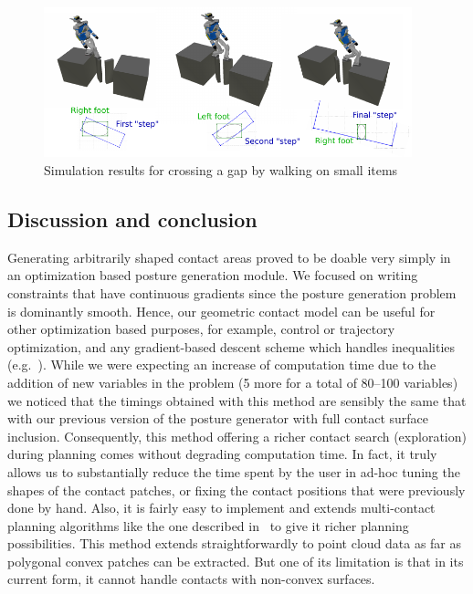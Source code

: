 \begin{figure}[!htb]
  \centering
  \includegraphics[width=0.95\textwidth]{riviere3steps.pdf}
  \caption{Simulation results for crossing a gap by walking on small items}
\label{fig:riviere}
\end{figure}



\subsection{Discussion and conclusion}


Generating arbitrarily shaped contact areas proved to be doable very simply in an optimization based posture generation module.
We focused on writing constraints that have continuous gradients since the posture generation problem is dominantly smooth.
Hence, our geometric contact model can be useful for other optimization based purposes, for example, control or trajectory optimization, and any gradient-based descent scheme which handles inequalities (e.g.~\cite{escande:icra:2010}).
While we were expecting an increase of computation time due to the addition of new variables in the problem (5 more for a total of 80--100 variables)
we noticed that the timings obtained with this method are sensibly the same that with our previous version of the posture generator with full contact surface inclusion.
Consequently, this method offering a richer contact search (exploration) during planning comes without degrading computation time.
In fact, it truly allows us to substantially reduce the time spent by the user in ad-hoc tuning the shapes of the contact patches, or fixing the contact positions that were previously done by hand.
Also, it is fairly easy to implement and extends multi-contact planning algorithms like the one described in~\cite{escande:ras:2013} to give it richer planning possibilities.
This method extends straightforwardly to point cloud data as far as polygonal convex patches can be extracted.
But one of its limitation is that in its current form, it cannot handle contacts with non-convex surfaces.

